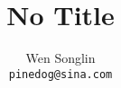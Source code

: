 \documentclass[12pt]{book}
\begin{document}
\title{No Title}
\author{Wen Songlin\\
        \tt\small pinedog@sina.com}
\date{}
\maketitle



\tableofcontents
\newpage

\mainmatter
{}



\end{document}
